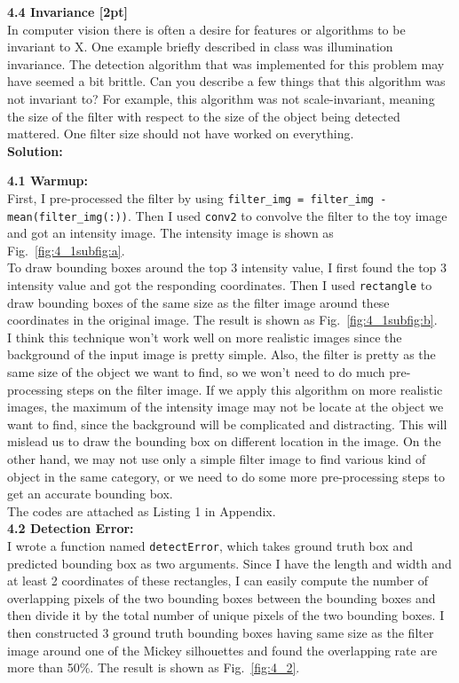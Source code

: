 \documentclass{assignment}
\begin{document}
\begin{problemlist}
\textbf{4.4 Invariance [2pt]}\\
In computer vision there is often a desire for features or algorithms to be invariant to X. One example briefly described in class was illumination invariance. The detection algorithm that was implemented for this problem may have seemed a bit brittle. Can you describe a few things that this algorithm was not invariant to? For example, this algorithm was not scale-invariant, meaning the size of the filter with respect to the size of the object being detected mattered. One filter size should not have worked on everything.\\

\textbf{Solution:}

\textbf{4.1 Warmup:}\\
First, I pre-processed the filter by using \texttt{filter\_img = filter\_img - mean(filter\_img(:))}. Then I used \texttt{conv2} to convolve the filter to the toy image and got an intensity image. The intensity image is shown as Fig.~\ref{fig:4_1subfig:a}.\\
To draw bounding boxes around the top 3 intensity value, I first found the top 3 intensity value and got the responding coordinates. Then I used \texttt{rectangle} to draw bounding boxes of the same size as the filter image around these coordinates in the original image. The result is shown as Fig.~\ref{fig:4_1subfig:b}.\\
I think this technique won't work well on more realistic images since the background of the input image is pretty simple. Also, the filter is pretty as the same size of the object we want to find, so we won't need to do much pre-processing steps on the filter image. If we apply this algorithm on more realistic images, the maximum of the intensity image may not be locate at the object we want to find, since the background will be complicated and distracting. This will mislead us to draw the bounding box on different location in the image. On the other hand, we may not use only a simple filter image to find various kind of object in the same category, or we need to do some more pre-processing steps to get an accurate bounding box.\\

The codes are attached as Listing 1 in Appendix.\\

\textbf{4.2 Detection Error:}\\
I wrote a function named \texttt{detectError}, which takes ground truth box and predicted bounding box as two arguments. Since I have the length and width and at least 2 coordinates of these rectangles, I can easily compute the number of overlapping pixels of the two bounding boxes between the bounding boxes and then divide it by the total number of unique pixels of the two bounding boxes.
I then constructed 3 ground truth bounding boxes having same size as the filter image around one of the Mickey silhouettes and found the overlapping rate are more than 50\%. The result is shown as Fig.~\ref{fig:4_2}.\\


\end{problemlist}
\end{document}
